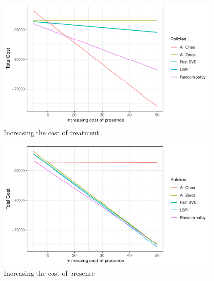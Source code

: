 \documentclass{article}
\theoremstyle{remark}
\theoremstyle{remark}
\theoremstyle{remark}
\theoremstyle{remark}
\theoremstyle{remark}
\theoremstyle{remark}
\begin{document}
\begin{figure}
  \centering
  \includegraphics[scale=.8]{increasing_cost_treatment.pdf}
  \caption{Increasing the cost of treatment}
  \label{fig:treatment}
\end{figure}



\begin{figure}
  \centering
  \includegraphics[scale=.8]{increasing_cost_presence.pdf}
  \caption{Increasing the cost of presence}
  \label{fig:presence}
\end{figure}





% 
% 
\end{document}
